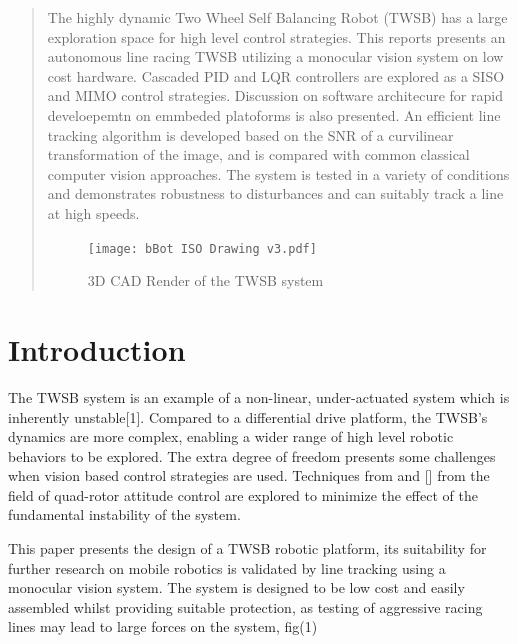   \begin{abstract} %
    The highly dynamic Two Wheel Self Balancing Robot 
    (TWSB) has a large exploration space for high level 
    control strategies. 
    This reports presents an autonomous line racing TWSB utilizing 
    a monocular vision system on low cost hardware. 
    Cascaded PID and LQR controllers 
    are explored as a SISO and MIMO control strategies. 
    Discussion on software architecure 
    for rapid develoepemtn on  emmbeded platoforms is also presented. 
    An efficient line tracking algorithm is developed based 
    on the SNR of a curvilinear transformation of the image, 
    and is compared with common classical computer vision approaches.
    The system is tested in a variety of conditions 
    and demonstrates robustness to disturbances 
    and can suitably track a line at high speeds.
    \begin{figure}[H]
    \texttt{[image: bBot ISO Drawing v3.pdf]}
    \caption{3D CAD Render of the TWSB system}
    \end{figure}

  \end{abstract}%
  \clearpage
  \section{Introduction}
    The TWSB system is an example of a non-linear, under-actuated system which is inherently unstable[1].
    Compared to a differential drive platform, the TWSB's dynamics are more complex, enabling a 
    wider range of high level robotic behaviors to be explored.
    The extra degree of freedom 
    presents some challenges when vision based control strategies are used. 
    Techniques from  and [] from the field of quad-rotor attitude control are explored to minimize the effect 
    of the fundamental instability of the system.

    This paper presents the design of a TWSB robotic platform, its suitability for further research on 
    mobile robotics is validated by line tracking using a monocular vision system.
    The system is designed to be low cost and easily assembled whilst providing suitable protection, 
    as testing of aggressive racing lines may lead to large forces on the system, fig(1)

